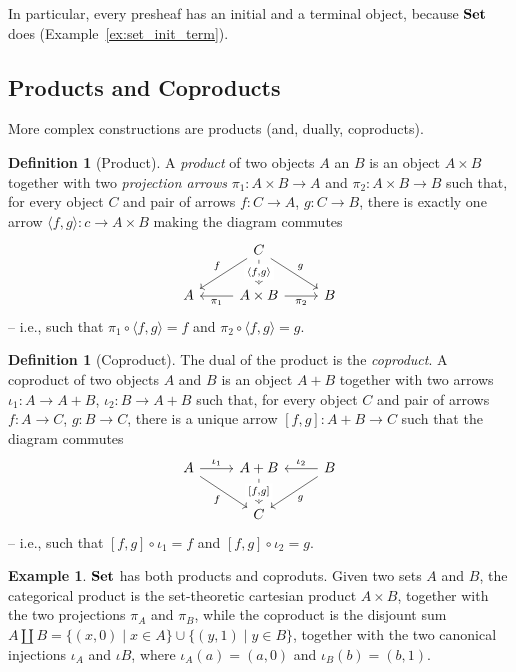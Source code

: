 \documentclass[a4paper, twoside,openright]{report}
\theoremstyle{plain}
\theoremstyle{definition}
\newtheorem{definition}[theorem]{Definition}
\newtheorem{example}[theorem]{Example}
\begin{document}
In particular, every presheaf has an initial and a terminal object, because $\mathbf{Set}$ does (Example~\ref{ex:set_init_term}).

\subsection{Products and Coproducts}

More complex constructions are products (and, dually, coproducts).

\begin{definition}[Product]
    A \emph{product} of two objects $A$ an $B$ is an object $A \times B$ together with two \emph{projection arrows} $\pi_1:A\times B \rightarrow A$ and $\pi_2: A \times B \rightarrow B$ such that, for every object $C$ and pair of arrows $f: C \rightarrow A$, $g: C \rightarrow B$, there is exactly one arrow $\langle f, g \rangle : c \rightarrow A \times B$ making the diagram commutes
    \[
        \begin{tikzcd}
                    & C \arrow[dl, "f" swap] \arrow[d, dashed, "{\langle f, g \rangle}" description] \arrow[dr, "g"] & \\
                A   & A \times B  \arrow[l, "{\pi_1}"] \arrow[r, "{\pi_2}" swap]    &  B    
        \end{tikzcd}
    \]
   -- i.e., such that $\pi_1 \circ \langle f, g \rangle = f$ and $\pi_2 \circ \langle f, g \rangle  = g$.
    
\end{definition}


\begin{definition}[Coproduct]
    The dual of the product is the \emph{coproduct}.
    A coproduct of two objects $A$ and $B$ is an object $A + B$ together with two arrows $\iota_1:A\rightarrow A+B$, $\iota_2: B \rightarrow A + B$ such that, for every object $C$ and pair of arrows $f:A \rightarrow C$, $g:B \rightarrow C$, there is a unique arrow $[f, g] : A + B \rightarrow C$ such that the diagram commutes
    \[
        \begin{tikzcd}
            A \arrow[r, "{\iota_1}"] \arrow[dr, "f" swap] & A+B \arrow[d, dashed, "{[f,g]}" description] & B \arrow[l, "{\iota_2}" swap] \arrow[dl, "g"] \\
            & C & 
        \end{tikzcd}
    \]
    -- i.e., such that $[f, g] \circ \iota_1 = f$ and $[f, g] \circ \iota_2 = g$.
\end{definition}

\begin{example}
    $\mathbf{Set}$ has both products and coproduts. Given two sets $A$ and $B$, the categorical product is the set-theoretic cartesian product $A \times B$, together with the two projections $\pi_A$ and $\pi_B$, while the coproduct is the disjount sum $A \coprod B = \{ (x, 0) \mid x \in A\} \cup \{(y, 1) \mid y \in B \}$, together with the two canonical injections $\iota_A$ and $\iota B$, where $\iota_A(a) = (a, 0)$ and $\iota_B(b) = (b, 1)$. 
\end{example}
\end{document}
